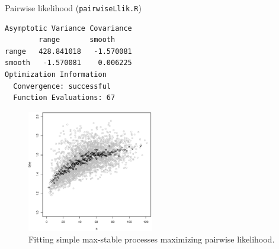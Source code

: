 \documentclass[blackslide,style=simple]{powerdot}
\theoremstyle{plain}%
\theoremstyle{definition}
\theoremstyle{remark}
\begin{document}
\begin{wideslide}[toc=Pairwise likelihood,method=file]{Pairwise
    likelihood (\texttt{pairwiseLlik.R})}
\begin{minipage}[l]{.33\linewidth}
{\begin{verbatim}
Asymptotic Variance Covariance
        range       smooth    
range   428.841018   -1.570081
smooth   -1.570081    0.006225
Optimization Information
  Convergence: successful 
  Function Evaluations: 67 
\end{verbatim}
}
  \end{minipage}
  \hfill
  \begin{minipage}[r]{.6\linewidth}
    \begin{figure}
      \centering
      \includegraphics[width=0.49\textwidth]{Figures/empExtCoeffRain}%
      \caption{Fitting simple max-stable processes maximizing pairwise
        likelihood.}
      \label{fig:pairLlik}
    \end{figure}
  \end{minipage}
\end{wideslide}
\end{document}
